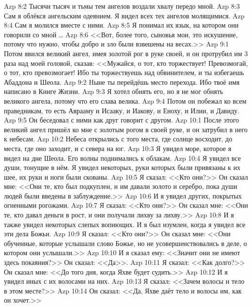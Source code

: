 \vs Azp 8:2
Тысячи тысяч и тьмы тем ангелов воздали хвалу передо мной.
\vs Azp 8:3
Сам я облёкся ангельским одеянием.
Я видел всех тех ангелов молящимися.
\vs Azp 8:4
Сам я молился вместе с ними.
\vs Azp 8:5
Я понимал их язык, на котором они говорили со мной \ldots
\vs Azp 8:6
<<Вот, более того, сыновья мои, это искушение, потому что нужно,
чтобы добро и зло были взвешены на весах.>>
\vs Azp 9:1
Потом явился великий ангел,
имея золотой рог в руке своей,
и он протрубил им 3 раза над моей головой, сказав:
<<Мужайся, о тот, кто торжествует!
Превозмогай, о тот, кто превозмогает!
Ибо ты торжествуешь над обвинителем,
и ты избегаешь Абаддона и Шеола.
\vs Azp 9:2
Hыне ты перейдёшь место перехода.
Ибо твоё имя написано в Книге Жизни.
\vs Azp 9:3
Я хотел обнять его, но я не мог обнять великого ангела,
потому что его слава велика.
\vs Azp 9:4
Потом он побежал ко всем праведникам,
то есть Аврааму и Исааку, и Иакову, и Еноху, и Илии, и Давиду.
\vs Azp 9:5
Он беседовал с ними как друг говорит с другом.
\vs Azp 10:1
После этого великий ангел пришёл ко мне
с золотым рогом в своей руке,
и он затрубил в него к небесам.
\vs Azp 10:2
Небеса открылись с того места, где солнце восходит,
до места, где оно заходит, и с севера на юг.
\vs Azp 10:3
Я увидел море, которое я видел на дне Шеола.
Его волны поднимались к облакам.
\vs Azp 10:4
Я увидел все души, тонущие в нём.
Я увидел некоторых,
руки которых были привязаны к их шее,
их руки и ноги были скованы.
\vs Azp 10:5
Я сказал:
<<Кто они?>>
Он сказал мне:
<<Они те, кто был подкуплен,
и им давали золото и серебро,
пока души людей были введены в заблуждение.>>
\vs Azp 10:6
И я увидел других, покрытых огненными рогожами.
\vs Azp 10:7
Я сказал:
<<Кто они?>>
Он сказал мне:
<<Они те, кто давал деньги в рост, и они получали лихву за лихву.>>
\vs Azp 10:8
И я также увидел некоторых слепых вопиющих.
И я был изумлен, когда я увидел все эти дела Божьи.
\vs Azp 10:9
Я сказал:
<<Кто они?>>
Он сказал мне:
<<Они обученные, которые услышали слово Божье,
но не усовершенствовались в деле, о котором они услышали.>>
\vs Azp 10:10
И я сказал ему:
<<Значит они не имеют здесь покаяния?>>
Он сказал:
<<Да>>.
\vs Azp 10:11
Я сказал:
<<Как долго?>>
Он сказал мне:
<<До того дня, когда Яхве будет судить.>>
\vs Azp 10:12
И я увидел иных с их волосами на них.
\vs Azp 10:13
Я сказал:
<<Зачем волосы и тело в этом месте?>>
\vs Azp 10:14
Он сказал:
<<Да, Яхве даёт тело и волосы им, как он хочет.>>
